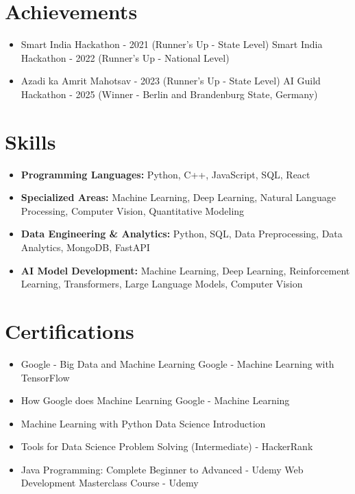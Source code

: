 \documentclass[a4paper,10pt]{article}
\begin{document}
\section*{Achievements}
\begin{itemize}
\item Smart India Hackathon - 2021 (Runner's Up - State Level) \hfill Smart India Hackathon - 2022 (Runner's Up - National Level)
\item Azadi ka Amrit Mahotsav - 2023 (Runner's Up - State Level) \hfill AI Guild Hackathon - 2025 (Winner - Berlin and Brandenburg State, Germany)
\end{itemize}

\section*{Skills}
\begin{itemize}
  \item \textbf{Programming Languages:} Python, C++, JavaScript, SQL, React
  \item \textbf{Specialized Areas:} Machine Learning, Deep Learning, Natural Language Processing, Computer Vision, Quantitative Modeling
  \item \textbf{Data Engineering \& Analytics:} Python, SQL, Data Preprocessing, Data Analytics, MongoDB, FastAPI
  \item \textbf{AI Model Development:} Machine Learning, Deep Learning, Reinforcement Learning, Transformers, Large Language Models, Computer Vision
\end{itemize}

\section*{Certifications}
\begin{itemize}
\item Google - Big Data and Machine Learning \hfill Google - Machine Learning with TensorFlow
\item How Google does Machine Learning \hfill Google - Machine Learning
\item Machine Learning with Python \hfill Data Science Introduction
\item Tools for Data Science \hfill Problem Solving (Intermediate) - HackerRank
\item Java Programming: Complete Beginner to Advanced - Udemy \hfill Web Development Masterclass Course - Udemy
\end{itemize}
\end{document}

